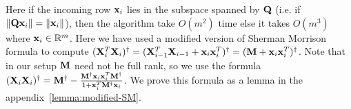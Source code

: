 Here if the incoming row $\mathbf{x}_{i}$ lies in the subspace spanned by $\mathbf{Q}$ (i.e. if $\|\mathbf{Q}\mathbf{x}_{i}\|=\|\mathbf{x}_{i}\|$), then the algorithm take $O(m^{2})$ time else it takes $O(m^{3})$ where $\mathbf{x}_{i} \in \mathbb{R}^{m}$. Here we have used a modified version of Sherman Morrison formula to compute $(\mathbf{X}_{i}^{T}\mathbf{X}_{i})^{\dagger} = (\mathbf{X}_{i-1}^{T}\mathbf{X}_{i-1}+\mathbf{x}_{i}\mathbf{x}_{i}^{T})^{\dagger} = (\mathbf{M}+\mathbf{x}_{i}\mathbf{x}_{i}^{T})^{\dagger}$. Note that in our setup $\mathbf{M}$ need not be full rank, so we use the formula $(\mathbf{X}_{i}\mathbf{X}_{i})^{\dagger} = \mathbf{M}^{\dagger} - \frac{\mathbf{M}^{\dagger}\mathbf{x}_{i}\mathbf{x}_{i}^{T}\mathbf{M}^{\dagger}}{1+\mathbf{x}_{i}^{T}\mathbf{M}^{\dagger}\mathbf{x}_{i}}$. We prove this formula as a lemma in the appendix~\ref{lemma:modified-SM}. 
